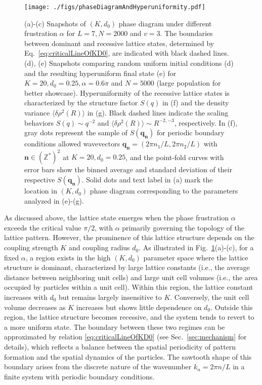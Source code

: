 \documentclass{article}
\begin{document}
\begin{figure}
    \centering
    \texttt{[image: ./figs/phaseDiagramAndHyperuniformity.pdf]}
    \caption{
        \label{fig:phaseDiagramAndHyperuniformity}
        (a)-(c) Snapshots of $(K, d_0)$ phase diagram under different frustration $\alpha$ for $L=7, N=2000$ and $v=3$. The boundaries between dominant and recessive lattice states, determined by Eq.~\eqref{eq:criticalLineOfKD0}, are indicated with black dashed lines.
        (d), (e) Snapshots comparing random uniform initial conditions (d) and the resulting hyperuniform final state (e) for $K=20, d_0=0.25, \alpha=0.6\pi$ and $N=5000$ (large population for better showcase).
        Hyperuniformity of the recessive lattice states is characterized by the structure factor $S(q)$ in (f) and the density variance $\langle \delta \rho ^2\left( R \right) \rangle $ in (g). 
        Black dashed lines indicate the scaling behaviors $S(q)\sim q^{-2}$ and $\langle \delta \rho ^2\left( R \right) \rangle\sim R^{-2,-3}$, respectively.
        In (f), gray dots represent the sample of $S(\mathbf{q}_{\mathbf{n}})$ for periodic boundary conditions allowed wavevectors $\mathbf{q}_{\mathbf{n}}=(2\pi n_1/L,2\pi n_2/L)$ with $\mathbf{n}\in \left( \mathbb{Z} ^* \right) ^2$ at $K=20, d_0=0.25$, and the point-fold curves with error bars show the binned average and standard deviation of their respective $S(\mathbf{q}_{\mathbf{n}})$.
        Solid dots and text label in (a) mark the location in $(K, d_0)$ phase diagram corresponding to the parameters analyzed in (e)-(g).
    }
\end{figure}

As discussed above, the lattice state emerges when the phase frustration $\alpha$ exceeds the critical value $\pi/2$, with $\alpha$ primarily governing the topology of the lattice pattern.
However, the prominence of this lattice structure depends on the coupling strength $K$ and coupling radius $d_0$.
As illustrated in Fig.~\ref{fig:phaseDiagramAndHyperuniformity}(a)-(c), for a fixed $\alpha$, a region exists in the high $(K, d_0)$ parameter space where the lattice structure is dominant, characterized by large lattice constants (i.e., the average distance between neighboring unit cells) and large unit cell volumes (i.e., the area occupied by particles within a unit cell).
Within this region, the lattice constant increases with $d_0$ but remains largely insensitive to $K$. Conversely, the unit cell volume decreases as $K$ increases but shows little dependence on $d_0$.
Outside this region, the lattice structure becomes recessive, and the system tends to revert to a more uniform state. The boundary between these two regimes can be approximated by relation \eqref{eq:criticalLineOfKD0} (see Sec.~\ref{sec:mechanism} for details), which reflects a balance between the spatial periodicity of pattern formation and the spatial dynamics of the particles. The sawtooth shape of this boundary arises from the discrete nature of the wavenumber $k_n=2\pi n/L$ in a finite system with periodic boundary conditions.
\end{document}
